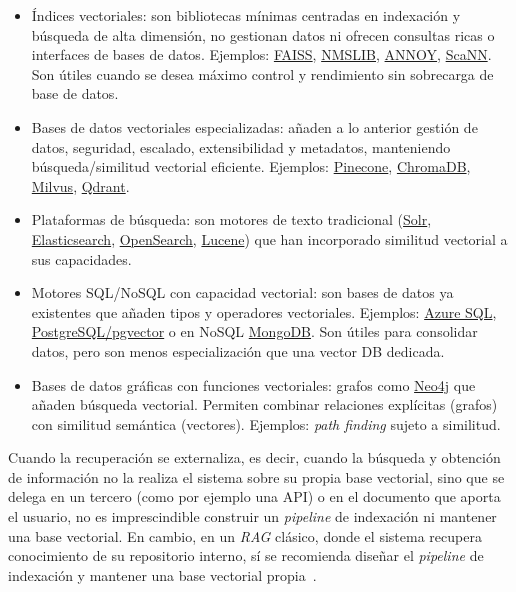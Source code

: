 \begin{itemize}
	\begin{itemize}
		\item Índices vectoriales: son bibliotecas mínimas centradas en indexación y búsqueda de alta dimensión, no gestionan datos ni ofrecen consultas ricas o interfaces de bases de datos. Ejemplos: \href{https://faiss.ai/index.html}{FAISS}, \href{https://nmslib.github.io/nmslib/}{NMSLIB}, \href{https://github.com/spotify/annoy}{ANNOY}, \href{https://milvus.io/docs/es/scann.md}{ScaNN}. Son útiles cuando se desea máximo control y rendimiento sin sobrecarga de base de datos.
		\item Bases de datos vectoriales especializadas: añaden a lo anterior gestión de datos, seguridad, escalado, extensibilidad y metadatos, manteniendo búsqueda/similitud vectorial eficiente. Ejemplos: \href{https://www.pinecone.io/}{Pinecone}, \href{https://www.trychroma.com/}{ChromaDB}, \href{https://milvus.io/es}{Milvus}, \href{https://qdrant.tech/}{Qdrant}.
		\item Plataformas de búsqueda: son motores de texto tradicional (\href{https://solr.apache.org/}{Solr}, \href{https://www.elastic.co/es/enterprise-search/vector-search}{Elasticsearch}, \href{https://opensearch.org/platform/vector-search/}{OpenSearch}, \href{https://lucene.apache.org/core/}{Lucene}) que han incorporado similitud vectorial a sus capacidades.
		\item Motores SQL/NoSQL con capacidad vectorial: son bases de datos ya existentes que añaden tipos y operadores vectoriales. Ejemplos: \href{https://azure.microsoft.com/es-es/products/azure-sql/database}{Azure SQL}, \href{https://www.postgresql.org/about/news/pgvector-070-released-2852/}{PostgreSQL/pgvector} o en NoSQL \href{https://www.mongodb.com/}{MongoDB}. Son útiles para consolidar datos, pero son menos especialización que una vector DB dedicada.
		\item Bases de datos gráficas con funciones vectoriales: grafos como \href{https://neo4j.com/}{Neo4j} que añaden búsqueda vectorial. Permiten combinar relaciones explícitas (grafos) con similitud semántica (vectores). Ejemplos: \textit{path finding} sujeto a similitud.
	\end{itemize}
\end{itemize} 

Cuando la recuperación se externaliza, es decir, cuando la búsqueda y obtención de información no la realiza el sistema sobre su propia base vectorial, sino que se delega en un tercero (como por ejemplo una API) o en el documento que aporta el usuario, no es imprescindible construir un \textit{pipeline} de indexación ni mantener una base vectorial. En cambio, en un \textit{RAG} clásico, donde el sistema recupera conocimiento de su repositorio interno, sí se recomienda diseñar el \textit{pipeline} de indexación y mantener una base vectorial propia~\cite{book:RAG_SimpleGuide}.

